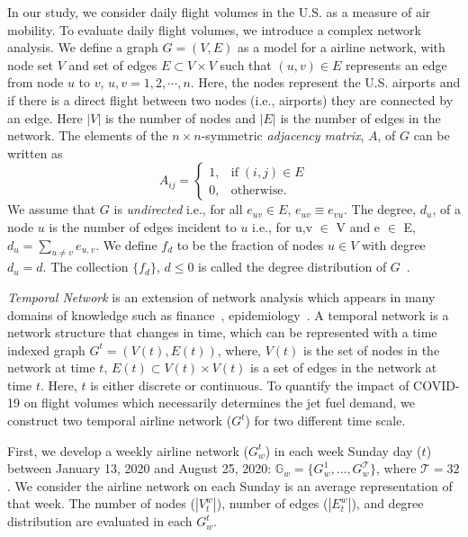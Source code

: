 \documentclass[review]{elsarticle}
\begin{document}
In our study, we consider daily flight volumes in the U.S. as a measure of air mobility. To evaluate daily flight volumes, we introduce a complex network analysis. We define a graph $G=(V, E)$ as a model for a airline network, with node set $V$ and set of edges $E \subset V \times V$ such that $(u,v) \in E$ represents an edge from node $u$ to $v$, $u,v=1,2, \cdots, n$.
Here, the nodes represent the U.S. airports and if there is a direct flight between two nodes (i.e., airports) they are connected by an edge. Here $|V|$ is the number of nodes and $|E|$ is the number of edges in the network. The elements of the $n\times n$-symmetric \textit{adjacency matrix}, $A$, of $G$ can be written as
\begin{equation}
A_{ij}=\begin{cases} 1, & \mbox{if}\; (i,j)\in E \\
0, & \mbox{otherwise}.
\end{cases}
\end{equation}
 We assume that $G$ is \textit{undirected} i.e., for all $e_{uv} \in E$,  $e_{uv}\equiv e_{vu}$.
 The degree, $d_u$, of a node $u$ is the number of edges incident to $u$ i.e., for u,v $\in$ V and e $\in$ E, $d_u = \sum_{u \neq v} e_{u,v}$.
We define $f_d$ to be the fraction of nodes $u \in V$ with degree $d_u = d$. The collection $\{f_d\}$, $d \le 0$ is called the degree distribution of $G$~\citep{Kolaczyk:Csardi:2014}.



\textit{Temporal Network} is an extension of network analysis which appears in many domains of knowledge such as finance~\citep{Battiston2010,Zhao2018}, epidemiology~\citep{Demirel2017,Dey2020VID19,Enright2018,Valdano2015}.  
A temporal network is a network structure that changes in time, which can be represented with a time indexed graph $G^t=(V(t),E(t))$, where, $V(t)$ is the set of nodes in the network at time $t$, $E(t) \subset V(t) \times V(t)$ is a set of edges in the network at time $t$. Here, $t$ is either discrete or continuous. To quantify the impact of COVID-19 on flight volumes which necessarily determines the jet fuel demand, we construct two temporal airline network ($G^t$) for two different time scale.

First, we develop a weekly airline network ($G^t_w$) in each week Sunday day ($t$) between January 13, 2020 and August 25, 2020: $\mathbb{G}_w = \{{G}^{1}_w, \ldots, {G}^{\mathcal{T}}_w\}$, where $\mathcal{T}=32$. We consider 
the airline network on each Sunday is an average representation of that week. The number of nodes ($|V^w_t|$), number of edges ($|E^w_t|$), and degree distribution are evaluated in each $G^t_w$.
\end{document}
